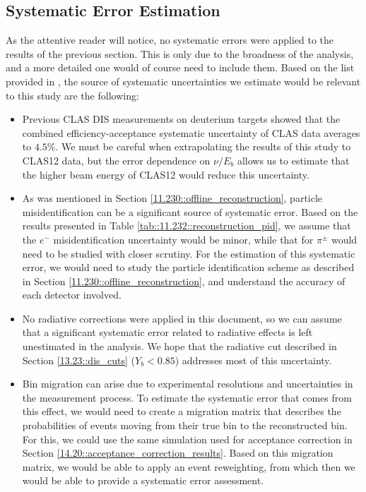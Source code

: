 \subsection{Systematic Error Estimation}
    \label{14.40::systematic_error_estimation}
    As the attentive reader will notice, no systematic errors were applied to the results of the previous section.
    This is only due to the broadness of the analysis, and a more detailed one would of course need to include them.
    Based on the list provided in \cite{osipenko2010}, the source of systematic uncertainties we estimate would be relevant to this study are the following:
    \begin{itemize}
        \item
            Previous CLAS DIS measurements \cite{osipenko2006} on deuterium targets showed that the combined efficiency-acceptance systematic uncertainty of CLAS data averages to $4.5\%$.
            We must be careful when extrapolating the results of this study to CLAS12 data, but the error dependence on $\nu/E_b$ allows us to estimate that the higher beam energy of CLAS12 would reduce this uncertainty.

        \item
            As was mentioned in Section \ref{11.230::offline_reconstruction}, particle misidentification can be a significant source of systematic error.
            Based on the results presented in Table \ref{tab::11.232::reconstruction_pid}, we assume that the $e^-$ misidentification uncertainty would be minor, while that for $\pi^\pm$ would need to be studied with closer scrutiny.
            For the estimation of this systematic error, we would need to study the particle identification scheme as described in Section \ref{11.230::offline_reconstruction}, and understand the accuracy of each detector involved.

        \item
            No radiative corrections were applied in this document, so we can assume that a significant systematic error related to radiative effects is left unestimated in the analysis.
            We hope that the radiative cut described in Section \ref{13.23::dis_cuts} ($Y_b < 0.85$) addresses most of this uncertainty.

        \item
            Bin migration can arise due to experimental resolutions and uncertainties in the measurement process.
            To estimate the systematic error that comes from this effect, we would need to create a migration matrix that describes the probabilities of events moving from their true bin to the reconstructed bin.
            For this, we could use the same simulation used for acceptance correction in Section \ref{14.20::acceptance_correction_results}.
            Based on this migration matrix, we would be able to apply an event reweighting, from which then we would be able to provide a systematic error assessment.


\end{itemize}
